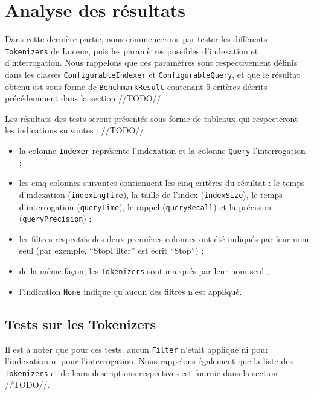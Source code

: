 \section{Analyse des résultats}

Dans cette dernière partie, nous commencerons par tester les différents \texttt{Tokenizers} de Lucene, puis les paramètres possibles d’indexation et d’interrogation. Nous rappelons que ces paramètres sont respectivement définis dans les classes \texttt{ConfigurableIndexer} et \texttt{ConfigurableQuery}, et que le résultat obtenu est sous forme de \texttt{BenchmarkResult} contenant 5 critères décrits précédemment dans la section //TODO//.

Les résultats des tests seront présentés sous forme de tableaux qui respecteront les indications suivantes : //TODO//
\begin{itemize}
    \item la colonne \texttt{Indexer} représente l’indexation et la colonne \texttt{Query} l’interrogation ;
    \item les cinq colonnes suivantes contiennent les cinq critères du résultat : le temps d’indexation (\texttt{indexingTime}), la taille de l’index (\texttt{indexSize}), le temps d’interrogation (\texttt{queryTime}), le rappel (\texttt{queryRecall}) et la précision (\texttt{queryPrecision}) ;
    \item les filtres respectifs des deux premières colonnes ont été indiqués par leur nom seul (par exemple, “StopFilter” est écrit “Stop”) ;
    \item de la même façon, les \texttt{Tokenizers} sont marqués par leur nom seul ;
    \item l’indication \texttt{None} indique qu’aucun des filtres n’est appliqué.
\end{itemize}

\subsection{Tests sur les Tokenizers}

Il est à noter que pour ces tests, aucun \texttt{Filter} n’était appliqué ni pour l’indexation ni pour l’interrogation. Nous rappelons également que la liste des \texttt{Tokenizers} et de leurs descriptions respectives est fournie dans la section //TODO//.

